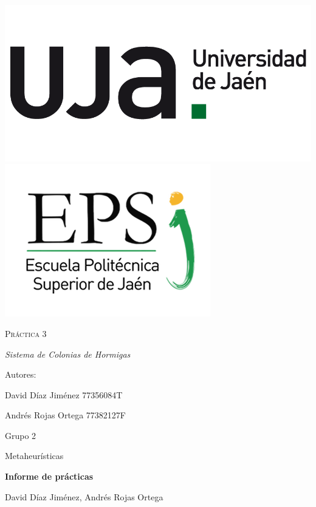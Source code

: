 	\begin{titlepage}
		\centering
		{\includegraphics[scale=0.25]{img/np_UJA_generica_6.png}
		\includegraphics[scale=0.40]{img/Logo_EPS.png}}
		\vfill
		{\scshape\Huge Práctica 3 \par
		\vspace{1cm}
		\itshape\Large Sistema de Colonias de Hormigas \par}
		\vfill
		{\Large Autores: \par}
		{\Large David Díaz Jiménez 77356084T \par}
		{\Large Andrés Rojas Ortega 77382127F\par}
		\vfill
		{\Large Grupo 2 \par}
	\end{titlepage}

	\begin{center}
	
	\begin{large}
		
		Metaheurísticas
		
	\end{large}
	
		\vspace*{0.2in}
		\textbf{\large Informe de prácticas}
		
		\vspace*{.2in}
		
		David Díaz Jiménez, Andrés Rojas Ortega
		
		\vspace*{2.5cm}
		
	\end{center}
	
	\tableofcontents
	
	\newpage

